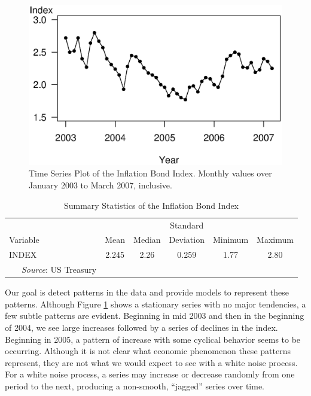 \begin{figure}[htp]
  \begin{center}
     \includegraphics[width=.68\textwidth]{Chapter8AutoReg/InfBondTS.eps}
    \caption{\label{F8:InfBondTS} \small Time Series Plot of the Inflation Bond
    Index. Monthly values over January 2003 to March 2007, inclusive.}
  \end{center}
\end{figure}

\bigskip

\begin{table}[h]
\caption{\label{T8:InfBondSumStats} Summary Statistics of the
Inflation Bond Index}
\begin{center}
\begin{tabular}{lccccc}
\hline
&  &  & Standard &  &  \\
Variable & Mean & Median & Deviation & Minimum & Maximum \\ \hline
INDEX & 2.245 & 2.26 & 0.259 & 1.77 & 2.80 \\
\hline ~~~\emph{Source}: US Treasury
\end{tabular}\end{center}\end{table}

\bigskip

Our goal is detect patterns in the data and provide models to
represent these patterns. Although Figure \ref{F8:InfBondTS} shows a
stationary series with no major tendencies, a few subtle patterns
are evident. Beginning in mid 2003 and then in the beginning of
2004, we see large increases followed by a series of declines in the
index. Beginning in 2005, a pattern of increase with some cyclical
behavior seems to be occurring. Although it is not clear what
economic phenomenon these patterns represent, they are not what we
would expect to see with a white noise process. For a white noise
process, a series may increase or decrease randomly from one period
to the next, producing a non-smooth, ``jagged'' series over time.

